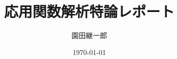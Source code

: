 \documentclass[a4paper,11pt]{jsarticle}
\begin{document}
\title{応用関数解析特論レポート}
\author{園田継一郎}
\date{\today}
\maketitle

\section{}
\end{document}
